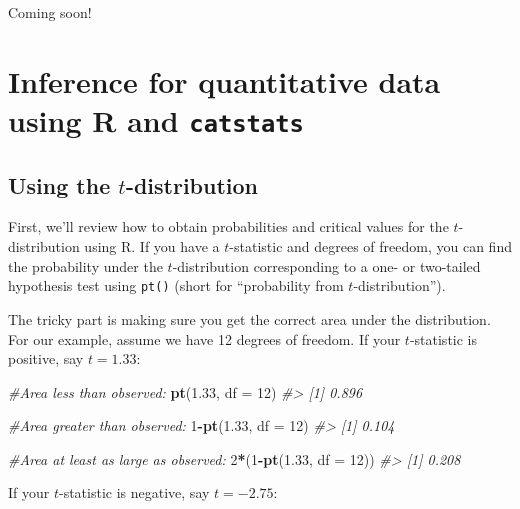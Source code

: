 \documentclass[
  10pt,
  openany]{book}
\newenvironment{Shaded}{\begin{snugshade}}{\end{snugshade}}
\newcommand{\AttributeTok}[1]{\textcolor[rgb]{0.13,0.29,0.53}{#1}}
\newcommand{\CommentTok}[1]{\textcolor[rgb]{0.56,0.35,0.01}{\textit{#1}}}
\newcommand{\DecValTok}[1]{\textcolor[rgb]{0.00,0.00,0.81}{#1}}
\newcommand{\FloatTok}[1]{\textcolor[rgb]{0.00,0.00,0.81}{#1}}
\newcommand{\FunctionTok}[1]{\textcolor[rgb]{0.13,0.29,0.53}{\textbf{#1}}}
\newcommand{\NormalTok}[1]{#1}
\newcommand{\SpecialCharTok}[1]{\textcolor[rgb]{0.81,0.36,0.00}{\textbf{#1}}}
\theoremstyle{definition}
\theoremstyle{definition}
\theoremstyle{definition}
\theoremstyle{definition}
\theoremstyle{remark}
\begin{document}
Coming soon!

\section{\texorpdfstring{Inference for quantitative data using R and \texttt{catstats}}{Inference for quantitative data using R and catstats}}\label{inference-for-quantitative-data-using-r-and-catstats}

\subsection*{\texorpdfstring{Using the \(t\)-distribution}{Using the t-distribution}}\label{using-the-t-distribution}

First, we'll review how to obtain probabilities and critical values for the \(t\)-distribution using R. If you have a \(t\)-statistic and degrees of freedom, you can find the probability under the \(t\)-distribution corresponding to a one- or two-tailed hypothesis test using \texttt{pt()} (short for ``probability from \(t\)-distribution'').

The tricky part is making sure you get the correct area under the distribution. For our example, assume we have 12 degrees of freedom. If your \(t\)-statistic is positive, say \(t = 1.33\):

\begin{Shaded}
\begin{Highlighting}[]
\CommentTok{\#Area less than observed:}
\FunctionTok{pt}\NormalTok{(}\FloatTok{1.33}\NormalTok{, }\AttributeTok{df =} \DecValTok{12}\NormalTok{)}
\CommentTok{\#\textgreater{} [1] 0.896}

\CommentTok{\#Area greater than observed:}
\DecValTok{1}\SpecialCharTok{{-}}\FunctionTok{pt}\NormalTok{(}\FloatTok{1.33}\NormalTok{, }\AttributeTok{df =} \DecValTok{12}\NormalTok{)}
\CommentTok{\#\textgreater{} [1] 0.104}

\CommentTok{\#Area at least as large as observed:}
\DecValTok{2}\SpecialCharTok{*}\NormalTok{(}\DecValTok{1}\SpecialCharTok{{-}}\FunctionTok{pt}\NormalTok{(}\FloatTok{1.33}\NormalTok{, }\AttributeTok{df =} \DecValTok{12}\NormalTok{))}
\CommentTok{\#\textgreater{} [1] 0.208}
\end{Highlighting}
\end{Shaded}

If your \(t\)-statistic is negative, say \(t = -2.75\):
\end{document}
